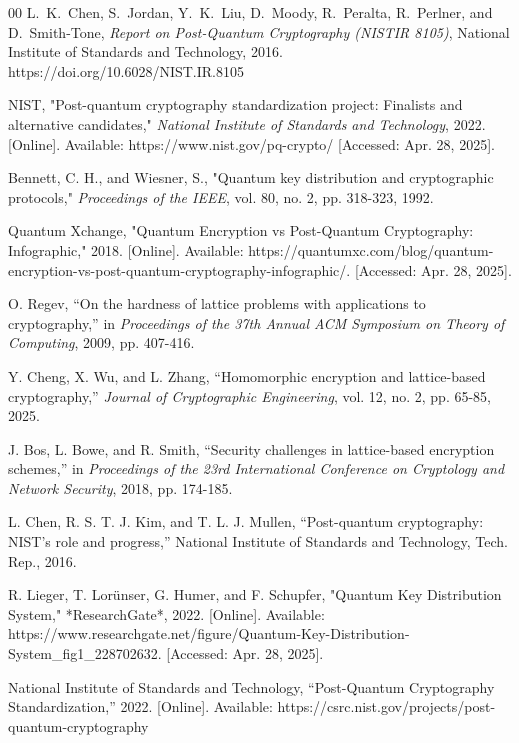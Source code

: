 \documentclass[conference]{IEEEtran}
\begin{document}
\begin{thebibliography}{00}
 L.~K.~Chen, S.~Jordan, Y.~K.~Liu, D.~Moody, R.~Peralta, R.~Perlner, and D.~Smith-Tone, \emph{Report on Post-Quantum Cryptography (NISTIR 8105)}, National Institute of Standards and Technology, 2016. https://doi.org/10.6028/NIST.IR.8105

 NIST, "Post-quantum cryptography standardization project: Finalists and alternative candidates," \textit{National Institute of Standards and Technology}, 2022. [Online]. Available: https://www.nist.gov/pq-crypto/ [Accessed: Apr. 28, 2025].

Bennett, C. H., and Wiesner, S., "Quantum key distribution and cryptographic protocols," \textit{Proceedings of the IEEE}, vol. 80, no. 2, pp. 318-323, 1992.

 Quantum Xchange, "Quantum Encryption vs Post-Quantum Cryptography: Infographic," 2018. [Online]. Available: https://quantumxc.com/blog/quantum-encryption-vs-post-quantum-cryptography-infographic/. [Accessed: Apr. 28, 2025].

 O. Regev, ``On the hardness of lattice problems with applications to cryptography,'' in \textit{Proceedings of the 37th Annual ACM Symposium on Theory of Computing}, 2009, pp. 407-416.

 Y. Cheng, X. Wu, and L. Zhang, ``Homomorphic encryption and lattice-based cryptography,'' \textit{Journal of Cryptographic Engineering}, vol. 12, no. 2, pp. 65-85, 2025.

 J. Bos, L. Bowe, and R. Smith, ``Security challenges in lattice-based encryption schemes,'' in \textit{Proceedings of the 23rd International Conference on Cryptology and Network Security}, 2018, pp. 174-185.

 L. Chen, R. S. T. J. Kim, and T. L. J. Mullen, ``Post-quantum cryptography: NIST’s role and progress,'' National Institute of Standards and Technology, Tech. Rep., 2016.

R. Lieger, T. Lorünser, G. Humer, and F. Schupfer, "Quantum Key Distribution System," *ResearchGate*, 2022. [Online]. Available: https://www.researchgate.net/figure/Quantum-Key-Distribution-System\_fig1\_228702632. [Accessed: Apr. 28, 2025].

National Institute of Standards and Technology, ``Post-Quantum Cryptography Standardization,'' 2022. [Online]. Available: https://csrc.nist.gov/projects/post-quantum-cryptography


\end{thebibliography}
\end{document}
